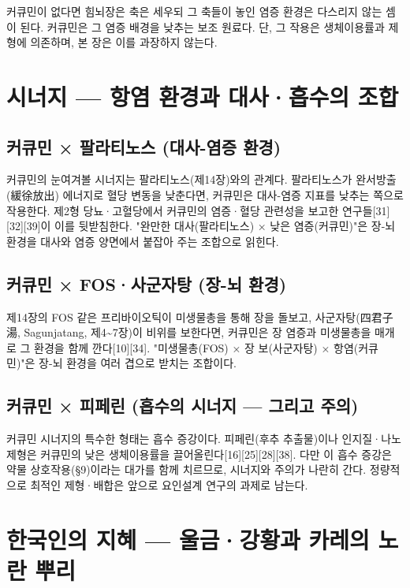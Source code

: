 \documentclass[12pt,oneside]{book}
\begin{document}
커큐민이 없다면 힘뇌장은 축은 세우되 그 축들이 놓인 염증 환경은 다스리지 않는 셈이 된다. 커큐민은 그 염증 배경을 낮추는 보조 원료다. 단, 그 작용은 생체이용률과 제형에 의존하며, 본 장은 이를 과장하지 않는다.

\section{시너지 — 항염 환경과 대사·흡수의 조합}

\subsection{커큐민 × 팔라티노스 (대사-염증 환경)}

커큐민의 눈여겨볼 시너지는 팔라티노스(제14장)와의 관계다. 팔라티노스가 완서방출(緩徐放出) 에너지로 혈당 변동을 낮춘다면, 커큐민은 대사-염증 지표를 낮추는 쪽으로 작용한다. 제2형 당뇨·고혈당에서 커큐민의 염증·혈당 관련성을 보고한 연구들[31][32][39]이 이를 뒷받침한다. "완만한 대사(팔라티노스) × 낮은 염증(커큐민)"은 장-뇌 환경을 대사와 염증 양면에서 붙잡아 주는 조합으로 읽힌다.

\subsection{커큐민 × FOS·사군자탕 (장-뇌 환경)}

제14장의 FOS 같은 프리바이오틱이 미생물총을 통해 장을 돌보고, 사군자탕(四君子湯, Sagunjatang, 제4\textasciitilde{}7장)이 비위를 보한다면, 커큐민은 장 염증과 미생물총을 매개로 그 환경을 함께 깐다[10][34]. "미생물총(FOS) × 장 보(사군자탕) × 항염(커큐민)"은 장-뇌 환경을 여러 겹으로 받치는 조합이다.

\subsection{커큐민 × 피페린 (흡수의 시너지 — 그리고 주의)}

커큐민 시너지의 특수한 형태는 흡수 증강이다. 피페린(후추 추출물)이나 인지질·나노 제형은 커큐민의 낮은 생체이용률을 끌어올린다[16][25][28][38]. 다만 이 흡수 증강은 약물 상호작용(§9)이라는 대가를 함께 치르므로, 시너지와 주의가 나란히 간다. 정량적으로 최적인 제형·배합은 앞으로 요인설계 연구의 과제로 남는다.

\section{한국인의 지혜 — 울금·강황과 카레의 노란 뿌리}
\end{document}
